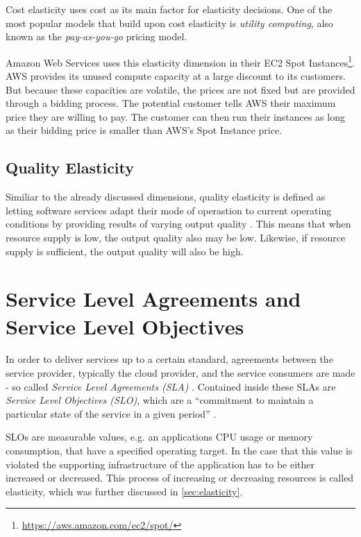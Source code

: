 Cost elasticity uses cost as its main factor for elasticity decisions. One of the most popular models that build upon cost elasticity is \textit{utility computing}, also known as the \textit{pay-as-you-go} pricing model.

Amazon Web Services uses this elasticity dimension in their EC2 Spot Instances\footnote{\url{https://aws.amazon.com/ec2/spot/}}. AWS provides its unused compute capacity at a large discount to its customers. But because these capacities are volatile, the prices are not fixed but are provided through a bidding process. The potential customer tells AWS their maximum price they are willing to pay. The customer can then run their instances as long as their bidding price is smaller than AWS's Spot Instance price.

\subsection{Quality Elasticity}

Similiar to the already discussed dimensions, quality elasticity is defined as letting software services adapt their mode of operastion to current operating conditions by providing results of varying output quality \cite{larssonQualityElasticityImprovedResource2019}. This means that when resource supply is low, the output quality also may be low. Likewise, if resource supply is sufficient, the output quality will also be high.

\section{Service Level Agreements and Service Level Objectives}

In order to deliver services up to a certain standard, agreements between the service provider, typically the cloud provider, and the service consumers are made - so called \textit{Service Level Agreements (SLA)} \cite{emeakarohaLowLevelMetrics2010d}. Contained inside these SLAs are \textit{Service Level Objectives (SLO)}, which are a ``commitment to maintain a particular state of the service in a given period'' \cite{kellerWSLAFrameworkSpecifying2003}.

SLOs are measurable values, e.g. an applications CPU usage or memory consumption, that have a specified operating target. In the case that this value is violated the supporting infrastructure of the application has to be either increased or decreased. This process of increasing or decreasing resources is called elasticity, which was further discussed in \cref{sec:elasticity}.

